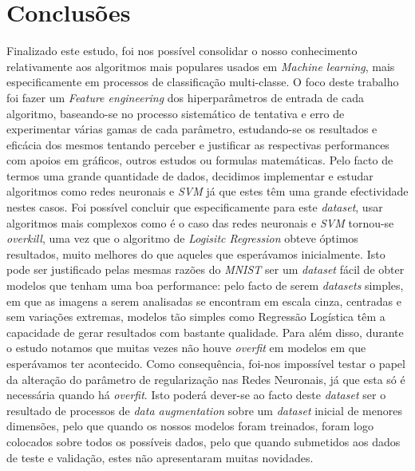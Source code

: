 \section{Conclusões}
Finalizado este estudo, foi nos possível consolidar o nosso conhecimento relativamente aos algoritmos mais populares usados em \textit{Machine learning}, mais especificamente em processos de classificação multi-classe. 
O foco deste trabalho foi fazer um \textit{Feature engineering} dos hiperparâmetros de entrada de cada algoritmo, baseando-se no processo sistemático de tentativa e erro de experimentar várias gamas de cada parâmetro, estudando-se os resultados e eficácia dos mesmos tentando perceber e justificar as respectivas performances com apoios em gráficos, outros estudos ou formulas matemáticas.
Pelo facto de termos uma grande quantidade de dados, decidimos implementar e estudar algoritmos como redes neuronais e \textit{SVM} já que estes têm uma grande efectividade nestes casos.
Foi possível concluir que especificamente para este \textit{dataset}, usar algoritmos mais complexos como é o caso das redes neuronais e \textit{SVM} tornou-se \textit{overkill}, uma vez que o algoritmo de \textit{Logisitc Regression} obteve óptimos resultados, muito melhores do que aqueles que esperávamos inicialmente. Isto pode ser justificado pelas mesmas razões do \textit{MNIST} ser um \textit{dataset} fácil de obter modelos que tenham uma boa performance: pelo facto de serem \textit{datasets} simples, em que as imagens a serem analisadas se encontram em escala cinza, centradas e sem variações extremas, modelos tão simples como Regressão Logística têm a capacidade de gerar resultados com bastante qualidade.
Para além disso, durante o estudo notamos que muitas vezes não houve \textit{overfit} em modelos em que esperávamos ter acontecido. Como consequência, foi-nos impossível testar o papel da alteração do parâmetro de regularização nas Redes Neuronais, já que esta só é necessária quando há \textit{overfit}. Isto poderá dever-se ao facto deste \textit{dataset} ser o resultado de processos de \textit{data augmentation} sobre um \textit{dataset} inicial de menores dimensões, pelo que quando os nossos modelos foram treinados, foram logo colocados sobre todos os possíveis dados, pelo que quando submetidos aos dados de teste e validação, estes não apresentaram muitas novidades.
